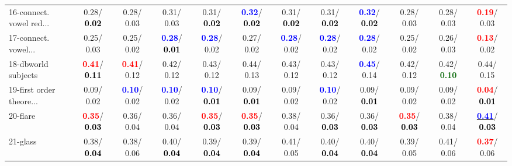 \begin{table}[h]
\begin{center}
{\begin{tabular}{lc|c|c|c|c|c|c|c|c|c|c}
16-connect. vowel red... &   0.28/\textcolor{black}{\textbf{  0.02}} &   0.28/  0.03 &   0.31/  0.03 &   0.31/\textcolor{black}{\textbf{  0.02}} & \textcolor{blue}{\textbf{  0.32}}/\textcolor{black}{\textbf{  0.02}} &   0.31/\textcolor{black}{\textbf{  0.02}} &   0.31/\textcolor{black}{\textbf{  0.02}} & \textcolor{blue}{\textbf{  0.32}}/\textcolor{black}{\textbf{  0.02}} &   0.28/  0.03 &   0.28/  0.03 & \textcolor{red}{\textbf{  0.19}}/  0.03 \\
17-connect. vowel... &   0.25/  0.03 &   0.25/  0.02 & \textcolor{blue}{\textbf{  0.28}}/\textcolor{black}{\textbf{  0.01}} & \textcolor{blue}{\textbf{  0.28}}/  0.02 &   0.27/  0.02 & \textcolor{blue}{\textbf{  0.28}}/  0.02 & \textcolor{blue}{\textbf{  0.28}}/  0.02 & \textcolor{blue}{\textbf{  0.28}}/  0.02 &   0.25/  0.02 &   0.26/  0.03 & \textcolor{red}{\textbf{  0.13}}/  0.02 \\
18-dbworld subjects & \textcolor{red}{\textbf{  0.41}}/\textcolor{black}{\textbf{  0.11}} & \textcolor{red}{\textbf{  0.41}}/  0.12 &   0.42/  0.12 &   0.43/  0.12 &   0.44/  0.13 &   0.43/  0.12 &   0.43/  0.12 & \textcolor{blue}{\textbf{  0.45}}/  0.14 &   0.42/  0.12 &   0.42/\textcolor{darkgreen}{\textbf{  0.10}} &   0.44/  0.15 \\
19-first order theore... &   0.09/  0.02 & \textcolor{blue}{\textbf{  0.10}}/  0.02 & \textcolor{blue}{\textbf{  0.10}}/  0.02 & \textcolor{blue}{\textbf{  0.10}}/\textcolor{black}{\textbf{  0.01}} &   0.09/\textcolor{black}{\textbf{  0.01}} &   0.09/  0.02 & \textcolor{blue}{\textbf{  0.10}}/  0.02 &   0.09/\textcolor{black}{\textbf{  0.01}} &   0.09/  0.02 &   0.09/  0.02 & \textcolor{red}{\textbf{  0.04}}/\textcolor{black}{\textbf{  0.01}} \\
20-flare & \textcolor{red}{\textbf{  0.35}}/\textcolor{black}{\textbf{  0.03}} &   0.36/  0.04 &   0.36/  0.04 & \textcolor{red}{\textbf{  0.35}}/\textcolor{black}{\textbf{  0.03}} & \textcolor{red}{\textbf{  0.35}}/\textcolor{black}{\textbf{  0.03}} &   0.38/  0.04 &   0.36/\textcolor{black}{\textbf{  0.03}} &   0.36/\textcolor{black}{\textbf{  0.03}} & \textcolor{red}{\textbf{  0.35}}/\textcolor{black}{\textbf{  0.03}} &   0.38/  0.04 & \underline{\textcolor{blue}{\textbf{  0.41}}}/\textcolor{black}{\textbf{  0.03}} \\
21-glass &   0.38/\textcolor{black}{\textbf{  0.04}} &   0.38/  0.06 &   0.40/\textcolor{black}{\textbf{  0.04}} &   0.39/\textcolor{black}{\textbf{  0.04}} &   0.39/\textcolor{black}{\textbf{  0.04}} &   0.41/  0.05 &   0.40/\textcolor{black}{\textbf{  0.04}} &   0.40/\textcolor{black}{\textbf{  0.04}} &   0.39/  0.05 &   0.41/  0.06 & \textcolor{red}{\textbf{  0.37}}/  0.06 \\ \hline

\end{tabular}}
\end{center}
\end{table}
